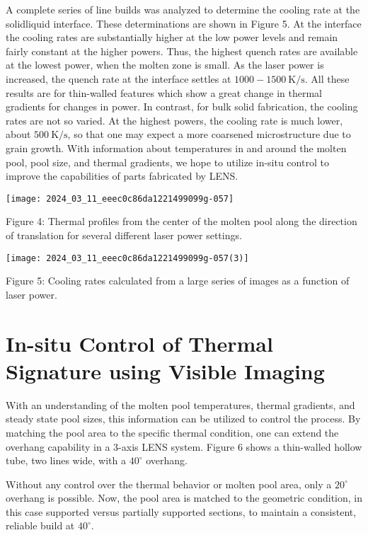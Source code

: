 \documentclass[10pt]{article}
\begin{document}
A complete series of line builds was analyzed to determine the cooling rate at the solidliquid interface. These determinations are shown in Figure 5. At the interface the cooling rates are substantially higher at the low power levels and remain fairly constant at the higher powers. Thus, the highest quench rates are available at the lowest power, when the molten zone is small. As the laser power is increased, the quench rate at the interface settles at $1000-1500 \mathrm{~K} / \mathrm{s}$. All these results are for thin-walled features which show a great change in thermal gradients for changes in power. In contrast, for bulk solid fabrication, the cooling rates are not so varied. At the highest powers, the cooling rate is much lower, about $500 \mathrm{~K} / \mathrm{s}$, so that one may expect a more coarsened microstructure due to grain growth. With information about temperatures in and around the molten pool, pool size, and thermal gradients, we hope to utilize in-situ control to improve the capabilities of parts fabricated by LENS.

\begin{center}
\texttt{[image: 2024\_03\_11\_eeec0c86da1221499099g-057]}
\end{center}

Figure 4: Thermal profiles from the center of the molten pool along the direction of translation for several different laser power settings.

\begin{center}
\texttt{[image: 2024\_03\_11\_eeec0c86da1221499099g-057(3)]}
\end{center}

Figure 5: Cooling rates calculated from a large series of images as a function of laser power.

\section*{In-situ Control of Thermal Signature using Visible Imaging}
With an understanding of the molten pool temperatures, thermal gradients, and steady state pool sizes, this information can be utilized to control the process. By matching the pool area to the specific thermal condition, one can extend the overhang capability in a 3-axis LENS system. Figure 6 shows a thin-walled hollow tube, two lines wide, with a $40^{\circ}$ overhang.

Without any control over the thermal behavior or molten pool area, only a $20^{\circ}$ overhang is possible. Now, the pool area is matched to the geometric condition, in this case supported versus partially supported sections, to maintain a consistent, reliable build at $40^{\circ}$.
\end{document}

